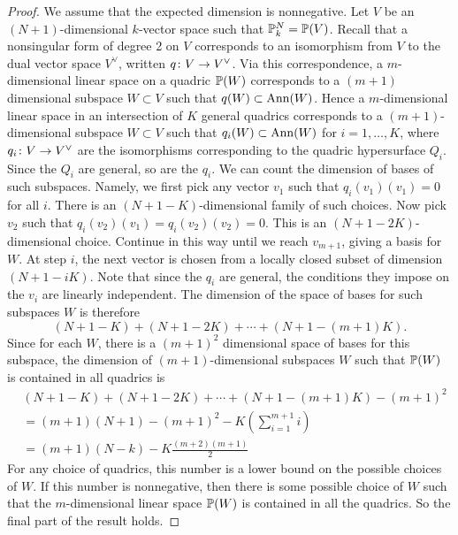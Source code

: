 \begin{proof}
We assume that the expected dimension is nonnegative. Let $V$ be an $(N+1)$-dimensional $k$-vector space such that $\P_k^N = \P(V)$. Recall that a nonsingular form of degree 2 on $V$ corresponds to an isomorphism from $V$ to the dual vector space $V^\vee$, written $q \from V \to V^\vee$. Via this correspondence, a $m$-dimensional linear space on a quadric $\P(W)$ corresponds to a $(m+1)$ dimensional subspace $W \subset V$ such that $q(W) \subset \Ann(W)$. Hence a $m$-dimensional linear space in an intersection of $K$ general quadrics corresponds to a $(m+1)$-dimensional subspace $W \subset V$ such that $q_i(W) \subset \Ann(W)$ for $i=1,\dots,K$, where $q_i\from V \to V^\vee$ are the isomorphisms corresponding to the quadric hypersurface $Q_i$. Since the $Q_i$ are general, so are the $q_i$. We can count the dimension of bases of such subspaces. Namely, we first pick any vector $v_1$ such that $q_i(v_1)(v_1) = 0$ for all $i$. There is an $(N+1-K)$-dimensional family of such choices. Now pick $v_2$ such that $q_i(v_2)(v_1) = q_i(v_2)(v_2) = 0$. This is an $(N+1-2K)$-dimensional choice. Continue in this way until we reach $v_{m+1}$, giving a basis for $W$. At step $i$, the next vector is chosen from a locally closed subset of dimension $(N+1-iK)$. Note that since the $q_i$ are general, the conditions they impose on the $v_i$ are linearly independent. The dimension of the space of bases for such subspaces $W$ is therefore
\[(N+1-K)+(N+1-2K)+\cdots+(N+1-(m+1)K).\]
Since for each $W$, there is a $(m+1)^2$ dimensional space of bases for this subspace, the dimension of $(m+1)$-dimensional subspaces $W$ such that $\P(W)$ is contained in all quadrics is
\begin{align*}
  &(N+1-K)+(N+1-2K)+\cdots+(N+1-(m+1)K) - (m+1)^2\\
 &= (m+1)(N+1) - (m+1)^2 - K \left(\sum_{i=1}^{m+1}i \right)\\
&= (m+1)(N-k) - K \frac{(m+2)(m+1)}{2}
\end{align*}
For any choice of quadrics, this number is a lower bound on the possible choices of $W$. If this number is nonnegative, then there is some possible choice of $W$ such that the $m$-dimensional linear space $\P(W)$ is contained in all the quadrics. So the final part of the result holds.

\end{proof}
